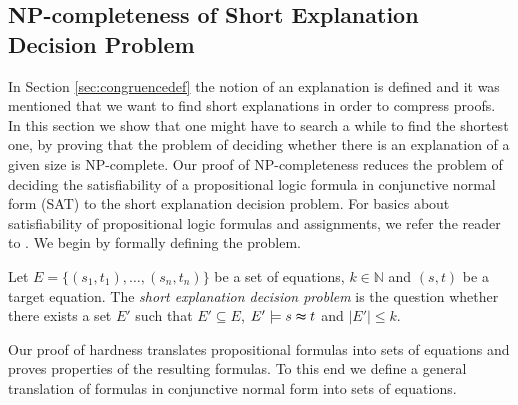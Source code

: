\subsection{NP-completeness of Short Explanation Decision Problem}
\label{sec:npcomplete}
In Section \ref{sec:congruencedef} the notion of an explanation is defined and it was mentioned that we want to find short explanations in order to compress proofs.
In this section we show that one might have to search a while to find the shortest one, by proving that the problem of deciding whether there is an explanation of a given size is NP-complete.
Our proof of NP-completeness reduces the problem of deciding the satisfiability of a propositional logic formula  in conjunctive normal form (SAT) to the short explanation decision problem.
For basics about satisfiability of propositional logic formulas and assignments, we refer the reader to \cite{Biere2009}.
We begin by formally defining the problem.

\begin{definition}

Let $E = \{(s_1,t_1),\ldots,(s_n,t_n)\}$ be a set of equations, $k \in \mathbb{N}$ and $(s,t)$ be a target equation.
The \emph{short explanation decision problem} is the question whether there exists a set $E'$ such that $E' \subseteq E$, $E' \models s \thickapprox t$ and $|E'| \leq k$.

\end{definition}

Our proof of hardness translates propositional formulas into sets of equations and proves properties of the resulting formulas.
To this end we define a general translation of formulas in conjunctive normal form into sets of equations.

